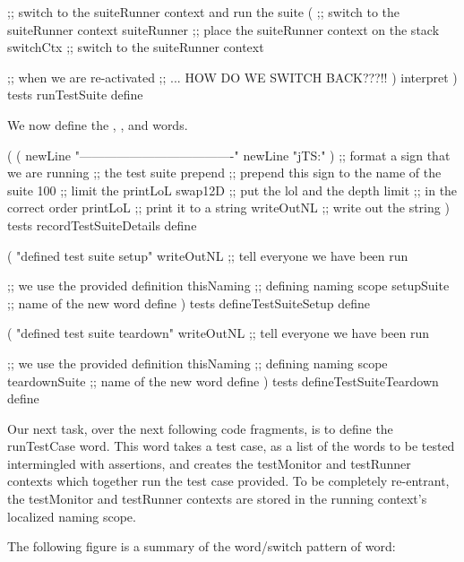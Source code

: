 \startJoylolCode
  ;; switch to the suiteRunner context and run the suite
  (
    ;; switch to the suiteRunner context
    suiteRunner ;; place the suiteRunner context on the stack
    switchCtx   ;; switch to the suiteRunner context
    
    ;; when we are re-activated
    ;; ... HOW DO WE SWITCH BACK???!!
  )
  interpret
)
tests
runTestSuite
define
\stopJoylolCode

We now define the , 
, and  words. 

\startJoylolCode
(
  (
    newLine
    "-------------------------------------"
    newLine
    "jTS:"
  )           ;; format a sign that we are running
              ;; the test suite
  prepend     ;; prepend this sign to the name of the suite
  100         ;; limit the printLoL
  swap12D     ;; put the lol and the depth limit 
              ;; in the correct order
  printLoL    ;; print it to a string
  writeOutNL  ;; write out the string
)
tests
recordTestSuiteDetails
define
\stopJoylolCode

\startJoylolCode
(
  "defined test suite setup"
  writeOutNL  ;; tell everyone we have been run

              ;; we use the provided definition
  thisNaming  ;; defining naming scope
  setupSuite  ;; name of the new word
  define
)
tests
defineTestSuiteSetup
define
\stopJoylolCode

\startJoylolCode
(
  "defined test suite teardown"
  writeOutNL    ;; tell everyone we have been run

                ;; we use the provided definition
  thisNaming    ;; defining naming scope
  teardownSuite ;; name of the new word
  define
)
tests
defineTestSuiteTeardown
define
\stopJoylolCode

\stopTestSuite

\startTestSuite[runTestCase]

Our next task, over the next following code fragments, is to define the 
runTestCase word. This word takes a test case, as a list of the words to 
be tested intermingled with assertions, and creates the testMonitor and 
testRunner contexts which together run the test case provided. To be 
completely re-entrant, the testMonitor and testRunner contexts are stored 
in the running context's localized naming scope. 

The following figure is a summary of the word/switch pattern of 
 word: 

